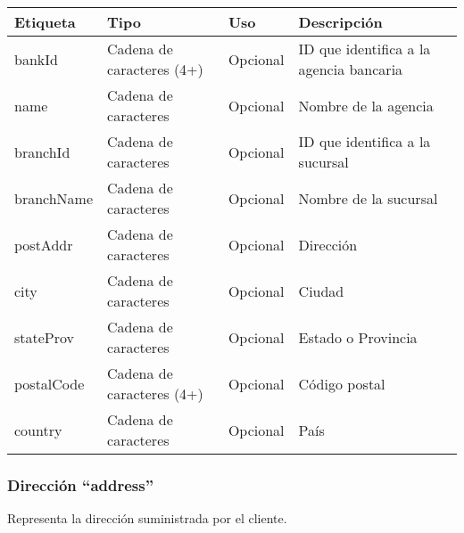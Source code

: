 \begin{center}
\begin{longtable}{|>{\centering\arraybackslash}p{}|>{\centering\arraybackslash}p{}|>{\centering\arraybackslash}p{}|>{\centering\arraybackslash}p{}|}
\hline 
\bfseries {Etiqueta} & \bfseries {Tipo} & \bfseries {Uso} & \bfseries {Descripción} \\ 
\hline 
bankId & Cadena de caracteres (4+) & Opcional & ID que identifica a la agencia bancaria \\ 
\hline 
name & Cadena de caracteres & Opcional & Nombre de la agencia \\ 
\hline 
branchId & Cadena de caracteres & Opcional & ID que identifica a la sucursal \\ 
\hline 
branchName & Cadena de caracteres & Opcional & Nombre de la sucursal \\ 
\hline 
postAddr & Cadena de caracteres & Opcional & Dirección \\ 
\hline
city & Cadena de caracteres & Opcional & Ciudad \\ 
\hline
stateProv & Cadena de caracteres & Opcional & Estado o Provincia \\ 
\hline
postalCode &  Cadena de caracteres (4+) & Opcional & Código postal \\ 
\hline
country & Cadena de caracteres & Opcional & País \\ 
\hline
\end{longtable}
\end{center}

\subsubsection{Dirección ``address''}
Representa la dirección suministrada por el cliente.

